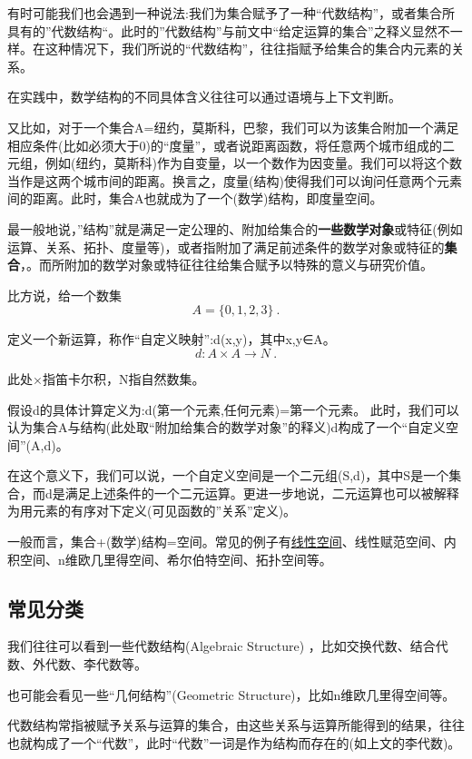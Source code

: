 有时可能我们也会遇到一种说法:我们为集合赋予了一种“代数结构”，或者集合所具有的”代数结构“。此时的”代数结构”与前文中“给定运算的集合”之释义显然不一样。在这种情况下，我们所说的“代数结构”，往往指赋予给集合的集合内元素的关系。

在实践中，数学结构的不同具体含义往往可以通过语境与上下文判断。

又比如，对于一个集合A={纽约，莫斯科，巴黎}，我们可以为该集合附加一个满足相应条件(比如必须大于0)的“度量”，或者说距离函数，将任意两个城市组成的二元组，例如(纽约，莫斯科)作为自变量，以一个数作为因变量。我们可以将这个数当作是这两个城市间的距离。换言之，度量(结构)使得我们可以询问任意两个元素间的距离。此时，集合A也就成为了一个(数学)结构，即度量空间。

最一般地说，”结构”就是满足一定公理的、附加给集合的\textbf{一些数学对象}或特征(例如运算、关系、拓扑、度量等)，或者指附加了满足前述条件的数学对象或特征的\textbf{集合}，。而所附加的数学对象或特征往往给集合赋予以特殊的意义与研究价值。

比方说，给一个数集
\begin{equation}
A = \{ 0,1,2,3 \}~.
\end{equation}

定义一个新运算，称作“自定义映射”:d(x,y)，其中x,y∈A。
\begin{equation}
d:A \times A  \to N~.
\end{equation}

此处×指笛卡尔积，N指自然数集。

假设d的具体计算定义为:d(第一个元素,任何元素)=第一个元素。
此时，我们可以认为集合A与结构(此处取“附加给集合的数学对象”的释义)d构成了一个“自定义空间”(A,d)。

在这个意义下，我们可以说，一个自定义空间是一个二元组(S,d)，其中S是一个集合，而d是满足上述条件的一个二元运算。更进一步地说，二元运算也可以被解释为用元素的有序对下定义(可见函数的”关系”定义)。

一般而言，集合+(数学)结构=空间。常见的例子有\href{https://wuli.wiki/online/LSpace.html}{线性空间}、线性赋范空间、内积空间、n维欧几里得空间、希尔伯特空间、拓扑空间等。

\subsection{常见分类}
我们往往可以看到一些代数结构(Algebraic Structure) ，比如交换代数、结合代数、外代数、李代数等。

也可能会看见一些“几何结构”(Geometric Structure)，比如n维欧几里得空间等。

代数结构常指被赋予关系与运算的集合，由这些关系与运算所能得到的结果，往往也就构成了一个“代数”，此时“代数”一词是作为结构而存在的(如上文的李代数)。

